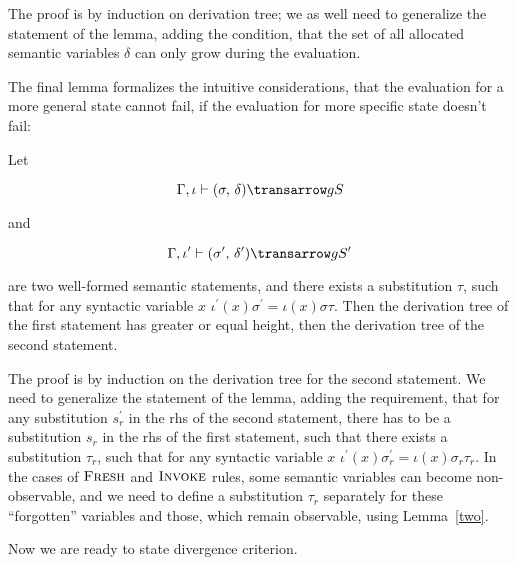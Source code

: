 The proof is by induction on derivation tree; we as well need to generalize the statement of the lemma, adding the condition, that the 
set of all allocated semantic variables $\delta$ can only grow during the evaluation.

The final lemma formalizes the intuitive considerations, that the evaluation for a more general state cannot fail, if the evaluation 
for more specific state doesn't fail:

\begin{lemma}
\label{three}
\normalfont
Let 

$$
\otrans{\Gamma,\iota}{(\sigma,\,\delta)}{g}{S}
$$ 

and 

$$\otrans{\Gamma,\iota^\prime}{(\sigma^\prime,\,\delta^\prime)}{g}{S^\prime}
$$

\noindent are two well-formed semantic statements, and there exists a substitution $\tau$, such that 
for any syntactic variable $x$ \mbox{$\iota^\prime(x) \sigma^\prime = \iota(x) \sigma \tau$}. Then the 
derivation tree of the first statement has greater or equal height, then the derivation 
tree of the second statement.
\end{lemma}

The proof is by induction on the derivation tree for the second statement. We need to generalize the statement of the lemma, adding the requirement, that 
for any substitution $s^\prime_r$ in the rhs of the second statement, there has to be a substitution $s_r$ in the rhs of the first statement,
such that there exists a substitution $\tau_r$, such that for any syntactic variable $x$ \mbox{$\iota^\prime(x) \sigma^\prime_r = \iota(x) \sigma_r \tau_r$}. 
In the cases of $\textsc{Fresh}$ and $\textsc{Invoke}$ rules, some semantic variables can become non-observable, and we need to define a substitution $\tau_r$ 
separately for these ``forgotten'' variables and those, which remain observable, using Lemma~\ref{two}.

Now we are ready to state divergence criterion.

